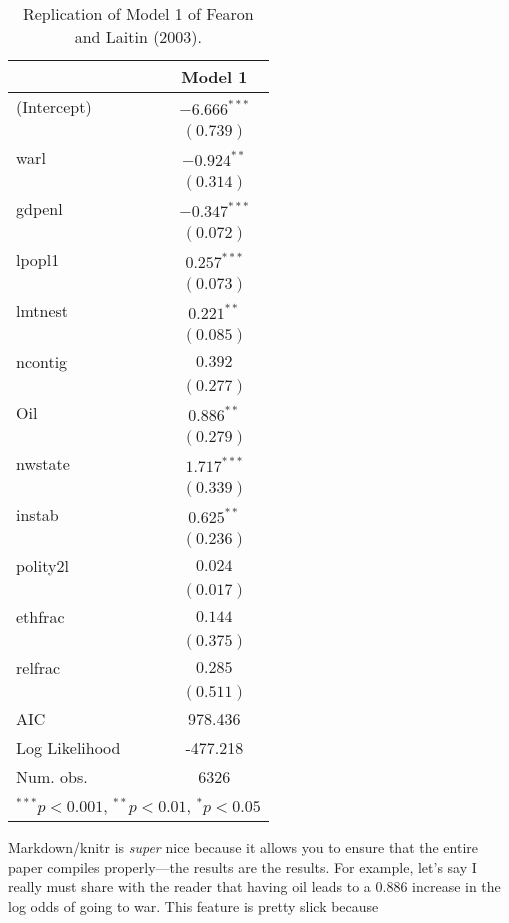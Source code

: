 \documentclass[12pt]{article}\usepackage[]{graphicx}\usepackage[]{color}
\begin{document}
\begin{table}
\begin{center}
\begin{tabular}{l c }
\hline
 & Model 1 \\
\hline
(Intercept)    & $-6.666^{***}$ \\
               & $(0.739)$      \\
warl           & $-0.924^{**}$  \\
               & $(0.314)$      \\
gdpenl         & $-0.347^{***}$ \\
               & $(0.072)$      \\
lpopl1         & $0.257^{***}$  \\
               & $(0.073)$      \\
lmtnest        & $0.221^{**}$   \\
               & $(0.085)$      \\
ncontig        & $0.392$        \\
               & $(0.277)$      \\
Oil            & $0.886^{**}$   \\
               & $(0.279)$      \\
nwstate        & $1.717^{***}$  \\
               & $(0.339)$      \\
instab         & $0.625^{**}$   \\
               & $(0.236)$      \\
polity2l       & $0.024$        \\
               & $(0.017)$      \\
ethfrac        & $0.144$        \\
               & $(0.375)$      \\
relfrac        & $0.285$        \\
               & $(0.511)$      \\
\hline
AIC            & 978.436        \\
Log Likelihood & -477.218       \\
Num. obs.      & 6326           \\
\hline
\multicolumn{2}{l}{\scriptsize{$^{***}p<0.001$, $^{**}p<0.01$, $^*p<0.05$}}
\end{tabular}
\caption{Replication of Model 1 of Fearon and Laitin (2003).}
\label{table:coefficients}
\end{center}
\end{table}


Markdown/knitr is \emph{super} nice because it allows you to ensure that the 
entire paper compiles properly---the results are the results. For example, 
let's say I really must share with the reader that having oil leads to a 
0.886 increase in the log odds of going to war. This feature is pretty slick because 
\end{document}
